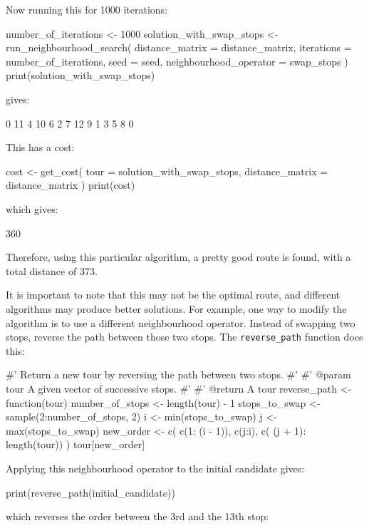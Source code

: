 Now running this for 1000 iterations:

\begin{Rin}
number_of_iterations <- 1000
solution_with_swap_stops <- run_neighbourhood_search(
  distance_matrix = distance_matrix,
  iterations = number_of_iterations,
  seed = seed,
  neighbourhood_operator = swap_stops
)
print(solution_with_swap_stops)
\end{Rin}

gives:

\begin{Rout}
 [1]  0 11  4 10  6  2  7 12  9  1  3  5  8  0
\end{Rout}

This has a cost:

\begin{Rin}
cost <- get_cost(
  tour = solution_with_swap_stops,
  distance_matrix = distance_matrix
)
print(cost)
\end{Rin}

which gives:

\begin{Rout}
[1] 360
\end{Rout}

Therefore, using this particular algorithm, a pretty good route is found, with a
total distance of 373.

It is important to note that this may not be the optimal route, and different algorithms
 may produce better solutions.
For example, one way to modify the algorithm is to use a different neighbourhood operator.
Instead of swapping two stops, reverse the path between those two
stops. The \texttt{reverse_path} function does this:


\begin{Rin}
#' Return a new tour by reversing the path between two stops.
#'
#' @param tour A given vector of successive stops.
#'
#' @return A tour
reverse_path <- function(tour){
  number_of_stops <- length(tour) - 1
  stops_to_swap <- sample(2:number_of_stops, 2)
  i <- min(stops_to_swap)
  j <- max(stops_to_swap)
  new_order <- c(
    c(1: (i - 1)),
    c(j:i),
    c( (j + 1): length(tour))
  )
  tour[new_order]
}
\end{Rin}

Applying this neighbourhood operator to the initial candidate gives:

\begin{Rin}
print(reverse_path(initial_candidate))
\end{Rin}

which reverses the order
between the 3rd and the 13th stop:

